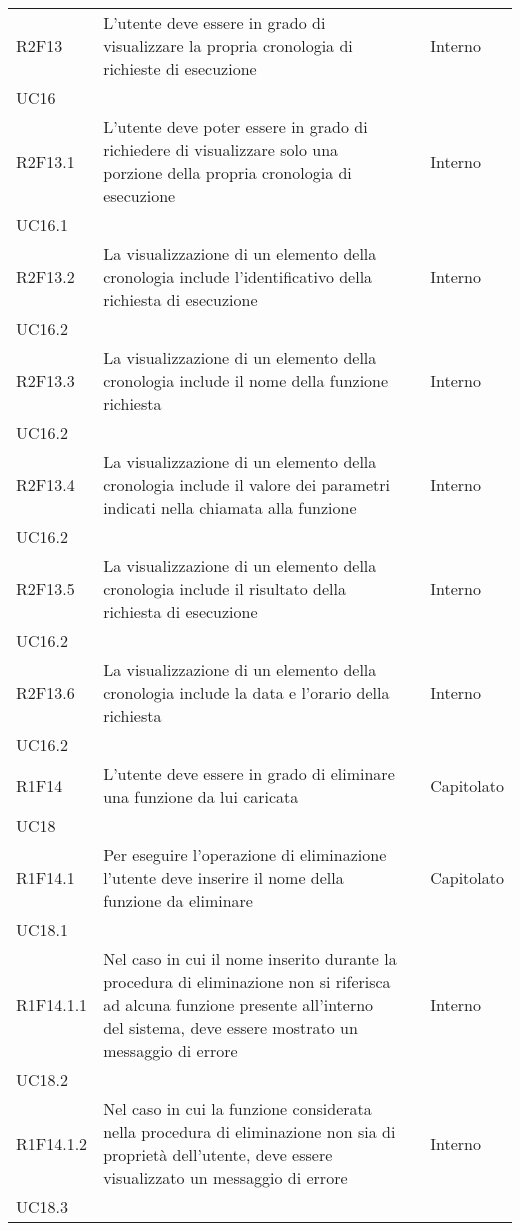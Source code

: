 \begin{longtable}{ 
		>{\centering}p{} 
		>{}p{} 
		>{\centering}p{}
		>{\centering}p{} }
	R2F13 & L'utente deve essere in grado di visualizzare la propria cronologia 
		di richieste di esecuzione 													& \de & Interno \\ UC16 \tabularnewline
	R2F13.1 & L'utente deve poter essere in grado di richiedere di visualizzare
		solo una porzione della propria cronologia di esecuzione 					& \de & Interno \\ UC16.1 \tabularnewline
	R2F13.2 & La visualizzazione di un elemento della cronologia include 
		l'identificativo della richiesta di esecuzione 								& \de & Interno \\ UC16.2 \tabularnewline
	R2F13.3 & La visualizzazione di un elemento della cronologia include 
		il nome della funzione richiesta 											& \de & Interno \\ UC16.2 \tabularnewline				
	R2F13.4 & La visualizzazione di un elemento della cronologia include 
		il valore dei parametri indicati nella chiamata alla funzione				& \de & Interno \\ UC16.2 \tabularnewline
	R2F13.5 & La visualizzazione di un elemento della cronologia include 
		il risultato della richiesta di esecuzione									& \de & Interno \\ UC16.2 \tabularnewline
	R2F13.6 & La visualizzazione di un elemento della cronologia include 
		la data e l'orario della richiesta 											& \de & Interno \\ UC16.2 \tabularnewline
	
	R1F14 & L'utente deve essere in grado di eliminare una funzione da lui caricata & \ob & Capitolato \\ UC18 \tabularnewline
	R1F14.1 & Per eseguire l'operazione di eliminazione l'utente deve inserire 
		il nome della funzione da eliminare 										& \ob & Capitolato \\ UC18.1 \tabularnewline
	R1F14.1.1 & Nel caso in cui il nome inserito durante la procedura di eliminazione
		non si riferisca ad alcuna funzione presente all'interno del sistema, deve 
		essere mostrato un messaggio di errore										& \ob & Interno \\ UC18.2 \tabularnewline
	R1F14.1.2 & Nel caso in cui la funzione considerata nella procedura di eliminazione
		non sia di proprietà dell'utente, deve essere visualizzato un messaggio 
		di errore																	& \ob & Interno \\ UC18.3 \tabularnewline

\end{longtable}